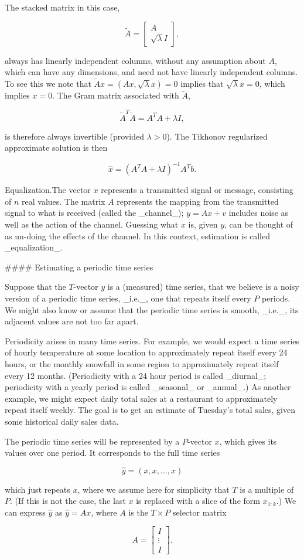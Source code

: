 The stacked matrix in this case,

\[\tilde{A}=\left[\begin{array}{c}A\\ \sqrt{\lambda}I\end{array}\right],\]

always has linearly independent columns, without any assumption about \(A\), which can have any dimensions, and need not have linearly independent columns. To see this we note that \(\tilde{A}x=(Ax,\sqrt{\lambda}x)=0\) implies that \(\sqrt{\lambda}x=0\), which implies \(x=0\). The Gram matrix associated with \(\tilde{A}\),

\[\tilde{A}^{T}\tilde{A}=A^{T}A+\lambda I,\]

is therefore always invertible (provided \(\lambda>0\)). The Tikhonov regularized approximate solution is then

\[\hat{x}=(A^{T}A+\lambda I)^{-1}A^{T}b.\]

Equalization.The vector \(x\) represents a transmitted signal or message, consisting of \(n\) real values. The matrix \(A\) represents the mapping from the transmitted signal to what is received (called the _channel_); \(y=Ax+v\) includes noise as well as the action of the channel. Guessing what \(x\) is, given \(y\), can be thought of as un-doing the effects of the channel. In this context, estimation is called _equalization_.

#### Estimating a periodic time series

Suppose that the \(T\)-vector \(y\) is a (measured) time series, that we believe is a noisy version of a periodic time series, _i.e._, one that repeats itself every \(P\) periods. We might also know or assume that the periodic time series is smooth, _i.e._, its adjacent values are not too far apart.

Periodicity arises in many time series. For example, we would expect a time series of hourly temperature at some location to approximately repeat itself every 24 hours, or the monthly snowfall in some region to approximately repeat itself every 12 months. (Periodicity with a 24 hour period is called _diurnal_; periodicity with a yearly period is called _seasonal_ or _annual_.) As another example, we might expect daily total sales at a restaurant to approximately repeat itself weekly. The goal is to get an estimate of Tuesday's total sales, given some historical daily sales data.

The periodic time series will be represented by a \(P\)-vector \(x\), which gives its values over one period. It corresponds to the full time series

\[\hat{y}=(x,x,\ldots,x)\]

which just repeats \(x\), where we assume here for simplicity that \(T\) is a multiple of \(P\). (If this is not the case, the last \(x\) is replaced with a slice of the form \(x_{1:k}\).) We can express \(\hat{y}\) as \(\hat{y}=Ax\), where \(A\) is the \(T\times P\) selector matrix

\[A=\left[\begin{array}{c}I\\ \vdots\\ I\end{array}\right].\] 